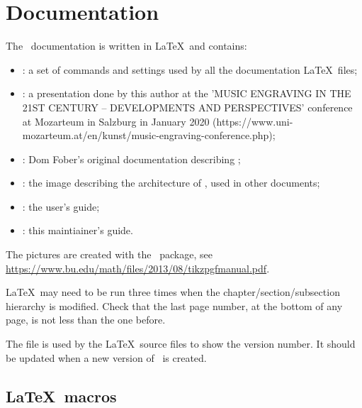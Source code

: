 
\chapter{Documentation}

The \mf\ documentation is written in \LaTeX\ and contains:
\begin{itemize}
\item {}: a set of commands and settings used by all the documentation \LaTeX\ files;
\item {}: a presentation done by this author at the 'MUSIC ENGRAVING IN THE 21ST CENTURY -- DEVELOPMENTS AND PERSPECTIVES' conference at Mozarteum in Salzburg in January 2020 (https://www.uni-mozarteum.at/en/kunst/music-engraving-conference.php);
\item {}: Dom Fober's original documentation describing \libmusicxml;
\item {}: the image describing the architecture of \mf, used in other documents;
\item {}: the user's guide;
\item {}: this maintiainer's guide.
\end{itemize}

The pictures are created with the \tikzpgf\ package, see \url{https://www.bu.edu/math/files/2013/08/tikzpgfmanual.pdf}.

\LaTeX\ may need to be run three times when the chapter/section/subsection hierarchy is modified. Check that the last page number, at the bottom of any page, is not less than the one before.

The file  is used by the \LaTeX\ source files to show the version number. It should be updated when a new version of \mf\ is created.


\section{\LaTeX\ macros}

